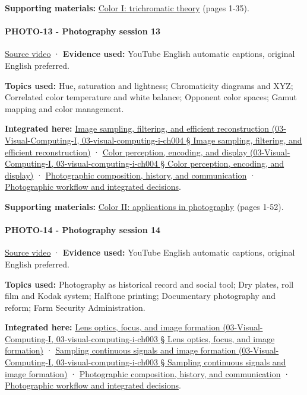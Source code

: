 \textbf{Supporting materials:} \href{https://drive.google.com/open?id=0B6w2XfPHEcZYekpvMVN6MkdlZ0U}{Color I: trichromatic theory} (pages 1-35).

\paragraph{PHOTO-13 - Photography session 13}\label{photo-13---photography-session-13}

\href{https://www.youtube.com/watch?v=6T_4mVZcozs}{Source video} · \textbf{Evidence used:} YouTube English automatic captions, original English preferred.

\textbf{Topics used:} Hue, saturation and lightness; Chromaticity diagrams and XYZ; Correlated color temperature and white balance; Opponent color spaces; Gamut mapping and color management.

\textbf{Integrated here:} \href{}{Image sampling, filtering, and efficient reconstruction (03-Visual-Computing-I, 03-visual-computing-i-ch004 § Image sampling, filtering, and efficient reconstruction)} · \href{}{Color perception, encoding, and display (03-Visual-Computing-I, 03-visual-computing-i-ch004 § Color perception, encoding, and display)} · \hyperref[04-visual-computing-ii-ch034]{Photographic composition, history, and communication} · \hyperref[04-visual-computing-ii-ch034]{Photographic workflow and integrated decisions}.

\textbf{Supporting materials:} \href{https://drive.google.com/open?id=0B6w2XfPHEcZYWllrZHZzRHlZWlk}{Color II: applications in photography} (pages 1-52).

\paragraph{PHOTO-14 - Photography session 14}\label{photo-14---photography-session-14}

\href{https://www.youtube.com/watch?v=p964fzQC11g}{Source video} · \textbf{Evidence used:} YouTube English automatic captions, original English preferred.

\textbf{Topics used:} Photography as historical record and social tool; Dry plates, roll film and Kodak system; Halftone printing; Documentary photography and reform; Farm Security Administration.

\textbf{Integrated here:} \href{}{Lens optics, focus, and image formation (03-Visual-Computing-I, 03-visual-computing-i-ch003 § Lens optics, focus, and image formation)} · \href{}{Sampling continuous signals and image formation (03-Visual-Computing-I, 03-visual-computing-i-ch003 § Sampling continuous signals and image formation)} · \hyperref[04-visual-computing-ii-ch034]{Photographic composition, history, and communication} · \hyperref[04-visual-computing-ii-ch034]{Photographic workflow and integrated decisions}.


